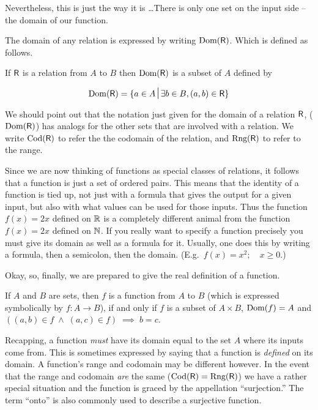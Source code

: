 Nevertheless, this is just the way it is \ldots  There is only one
set on the input side -- the domain of our function. 

The domain of
any relation is expressed by writing $\mbox{Dom}(\mbox{\textsf R})$.  Which is 
defined as follows.

\begin{defi}
If $\mbox{\textsf R}$ is a relation from $A$ to $B$ then $\mbox{Dom}(\mbox{\textsf R})$ is
a subset of $A$ defined by

\[ \Dom{\relR} = \{a \in A \suchthat \exists b \in B, (a,b) \in \relR \} 
\]

\end{defi}

We should point out that the notation just given for the domain of a 
relation $\mbox{\textsf R}$, ($\mbox{Dom}(\mbox{\textsf R})$) has analogs for the other 
sets that are involved with a relation.  We write $\mbox{Cod}(\mbox{\textsf R})$
to refer the the codomain of the relation, and $\mbox{Rng}(\mbox{\textsf R})$
to refer to the range. 

Since we are now thinking of functions as special classes of relations, it follows that a function is just 
a set of ordered pairs.  This means that the identity of a function is
tied up, not just with a formula that gives the output for a given input,
but also with what values can be used for those inputs.   Thus the function
$f(x)=2x$ defined on ${\mathbb R}$ is a completely different animal from 
the function $f(x)=2x$ defined on ${\mathbb N}$.  If you really want to
specify a function precisely you must give its domain as well as a 
formula for it.  Usually, one does this by writing a formula, then a 
semicolon, then the domain.  (E.g.\ $f(x)=x^2; \quad x \geq 0$.)

Okay, so, finally, we are prepared to give the real
definition of a function.

\begin{defi}
If $A$ and $B$ are sets, then $f$ is a function from $A$ to $B$ (which
is expressed symbolically by $f:A\longrightarrow B$), if and only if
$f$ is a subset of $A\times B$, $\mbox{Dom}(f)=A$ and $((a,b) \in f \; \land \; (a,c) \in f) \; \implies \; b=c$.
\end{defi}

Recapping, a function \emph{must} have its domain equal to the set $A$
where its inputs come from.  This is sometimes expressed by saying that
a function is \emph{defined} on its domain.  A function's range and codomain
may be different however.  In the event that the range and codomain \emph{are}
the same ($\mbox{Cod}(\mbox{\textsf R}) = \mbox{Rng}(\mbox{\textsf R})$)
we have a rather special situation and the function is graced by
the appellation ``surjection.''  The term ``onto'' is also commonly used
to describe a surjective function.  

